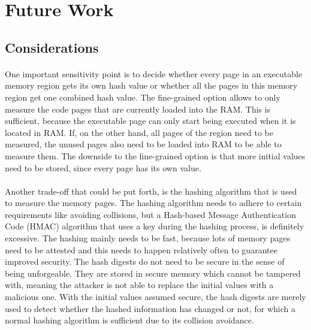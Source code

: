 \section{Future Work}

\subsection*{Considerations}

\paragraph*{}
One important sensitivity point is to decide whether every page in an executable memory region gets its own hash value or whether all the pages in this memory region get one combined hash value. The fine-grained option allows to only measure the code pages that are currently loaded into the RAM. This is sufficient, because the executable page can only start being executed when it is located in RAM. If, on the other hand, all pages of the region need to be measured, the unused pages also need to be loaded into RAM to be able to measure them. The downside to the fine-grained option is that more initial values need to be stored, since every page has its own value.

\paragraph*{}
Another trade-off that could be put forth, is the hashing algorithm that is used to measure the memory pages. The hashing algorithm needs to adhere to certain requirements like avoiding collisions, but a Hash-based Message Authentication Code (HMAC) algorithm that uses a key during the hashing process, is definitely excessive. The hashing mainly needs to be fast, because lots of memory pages need to be attested and this needs to happen relatively often to guarantee improved security. The hash digests do not need to be secure in the sense of being unforgeable. They are stored in secure memory which cannot be tampered with, meaning the attacker is not able to replace the initial values with a malicious one. With the initial values assumed secure, the hash digests are merely used to detect whether the hashed information has changed or not, for which a normal hashing algorithm is sufficient due to its collision avoidance.

